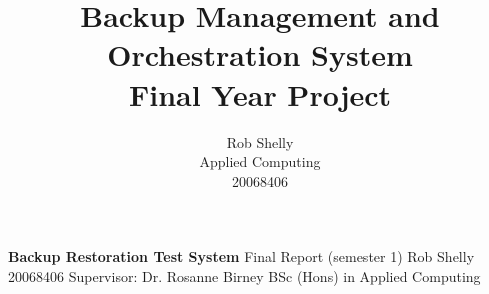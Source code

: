 \documentclass[]{article}
\title{Backup Management and Orchestration System\\
	Final Year Project}
\author{Rob Shelly\\
	Applied Computing\\
	20068406}
\begin{document}
\noindent \LARGE{\textbf{Backup Restoration Test System}}
\bigbreak
\noindent \large{Final Report (semester 1)}
\bigbreak
\noindent \Large{Rob Shelly}
\bigbreak
\noindent \Large{20068406}
\bigbreak
\noindent \Large{Supervisor: Dr. Rosanne Birney}
\bigbreak
\bigbreak
\noindent \Large{BSc (Hons) in Applied Computing}
\thispagestyle{empty}

\newpage
{}
\tableofcontents

\newpage
{}









\newpage
\renewcommand*{\bibfont}{\raggedright}



\begin{appendices}
  
  
\end{appendices}
\end{document}

